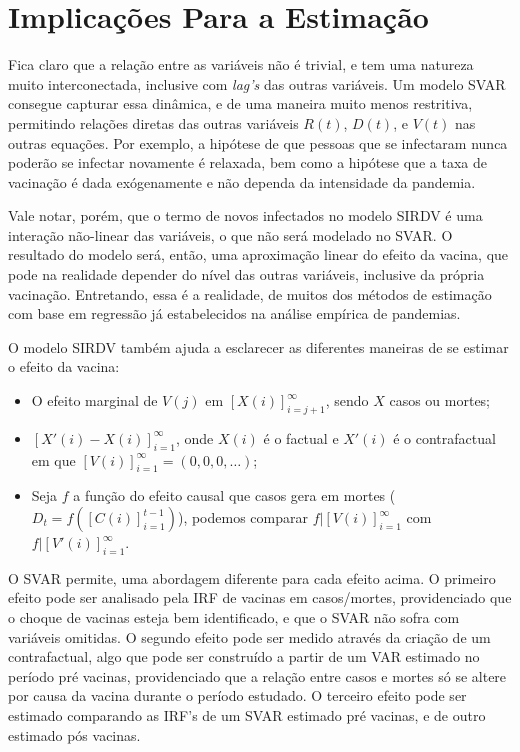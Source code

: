\documentclass[
	12pt,				%
	oneside,			%
	a4paper,			%
	english,			%
	brazil				%
	hyperref = {colorlinks, citecolor=c1d, linkcolor=c2d, urlcolor=c3d, colorlinks}
	]{abntex2}
\newcounter{j}
\begin{document}
\section{Implicações Para a Estimação}\label{sec:teorico2}

Fica claro que a relação entre as variáveis não é trivial, e tem uma natureza muito interconectada, inclusive com \textit{lag's} das outras variáveis. Um modelo SVAR consegue capturar essa dinâmica, e de uma maneira muito menos restritiva, permitindo relações diretas das outras variáveis $R(t)$, $D(t)$, e $V(t)$ nas outras equações. Por exemplo, a hipótese de que pessoas que se infectaram nunca poderão se infectar novamente é relaxada, bem como a hipótese que a taxa de vacinação é dada exógenamente e não dependa da intensidade da pandemia.

Vale notar, porém, que o termo de novos infectados no modelo SIRDV é uma interação não-linear das variáveis, o que não será modelado no SVAR. O resultado do modelo será, então, uma aproximação linear do efeito da vacina, que pode na realidade depender do nível das outras variáveis, inclusive da própria vacinação. Entretando, essa é a realidade, de muitos dos métodos de estimação com base em regressão já estabelecidos na análise empírica de pandemias.

O modelo SIRDV também ajuda a esclarecer as diferentes maneiras de se estimar o efeito da vacina:

\begin{itemize}
    \item O efeito marginal de $V(j)$ em $[X(i)]_{i=j+1}^\infty$, sendo $X$ casos ou mortes;
    \item $[X'(i) - X(i)]_{i=1}^\infty$, onde $X(i)$ é o factual e $X'(i)$ é o contrafactual em que $[V(i)]_{i=1}^\infty = (0, 0, 0, \dots)$;
    \item Seja $f$ a função do efeito causal que casos gera em mortes ($D_t = f([C(i)]_{i=1}^{t-1})$), podemos comparar $f|[V(i)]_{i=1}^\infty$ com $f|[V'(i)]_{i=1}^\infty$.
\end{itemize}

O SVAR permite, uma abordagem diferente para cada efeito acima. O primeiro efeito pode ser analisado pela IRF de vacinas em casos/mortes, providenciado que o choque de vacinas esteja bem identificado, e que o SVAR não sofra com variáveis omitidas. O segundo efeito pode ser medido através da criação de um contrafactual, algo que pode ser construído a partir de um VAR estimado no período pré vacinas, providenciado que a relação entre casos e mortes só se altere por causa da vacina durante o período estudado. O terceiro efeito pode ser estimado comparando as IRF's de um SVAR estimado pré vacinas, e de outro estimado pós vacinas.
\end{document}
